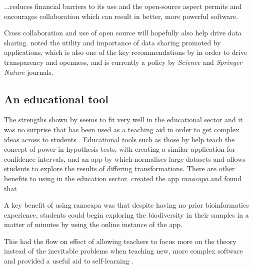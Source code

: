 \begin{displayquote}
	...reduces financial barriers to its use and the open-source aspect permits and encourages collaboration which can result in better, more powerful software.
\end{displayquote}

Cross collaboration and use of open source  will hopefully also help drive data sharing.  \citet{yi_zika_2017} noted the utility and importance of data sharing promoted by  applications, which is also one of the key recommendations by \citet{munafo_manifesto_2017} in order to drive transparency and openness, and is currently a policy by \textit{Science} and \textit{Springer Nature} journals.



\subsection{An educational tool}

The strengths shown by  seems to fit very well in the educational sector and it was no surprise that  has been used as a teaching aid in order to get complex ideas across to students \citep{williams_using_2018}.  Educational tools such as those by \citet{arnholt_using_2018} help teach the concept of power in hypothesis tests, with \citet{williams_using_2018} creating a similar application for confidence intervals, and an app by \citet{courtney_dealing_2018} which normalises large datasets and allows students to explore the results of differing transformations.  There are other benefits to using  in the education sector.  \citet{kandlikar_ranacapa_2018} created the  app \textit{ranacapa} and found that

\begin{displayquote}
	A key benefit of using ranacapa was that despite having no prior bioinformatics experience, students could begin exploring the biodiversity in their samples in a matter of minutes by using the online instance of the  app.
\end{displayquote}

This had the flow on effect of allowing teachers to focus more on the theory instead of the inevitable problems when teaching new, more complex software and provided a useful aid to self-learning \citep{kandlikar_ranacapa_2018}.


